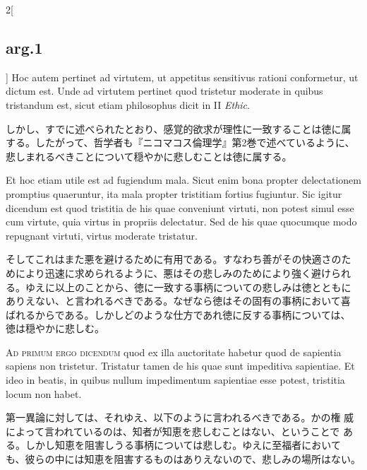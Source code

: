 \documentclass[paper=a4paper,fontsize=10pt,jafontsize=9pt,titlepage]{jlreq}
\begin{document}
\begin{paracol}{2}[\subsection{arg.1}]
Hoc autem pertinet ad virtutem, ut appetitus sensitivus rationi
 conformetur, ut dictum est. Unde ad virtutem pertinet quod tristetur
 moderate in quibus tristandum est, sicut etiam philosophus dicit in
 II {\itshape Ethic}.

\switchcolumn

しかし、すでに述べられたとおり、感覚的欲求が理性に一致することは徳に属
する。したがって、哲学者も『ニコマコス倫理学』第2巻で述べているように、
悲しまれるべきことについて穏やかに悲しむことは徳に属する。

\switchcolumn*

Et hoc etiam utile est ad fugiendum mala. Sicut
 enim bona propter delectationem promptius quaeruntur, ita mala
 propter tristitiam fortius fugiuntur. Sic igitur dicendum est quod
 tristitia de his quae conveniunt virtuti, non potest simul esse cum
 virtute, quia virtus in propriis delectatur. Sed de his quae
 quocumque modo repugnant virtuti, virtus moderate tristatur.

\switchcolumn

そしてこれはまた悪を避けるために有用である。すなわち善がその快適さのた
めにより迅速に求められるように、悪はその悲しみのためにより強く避けられ
る。ゆえに以上のことから、徳に一致する事柄についての悲しみは徳とともに
ありえない、と言われるべきである。なぜなら徳はその固有の事柄において喜
ばれるからである。しかしどのような仕方であれ徳に反する事柄については、
徳は穏やかに悲しむ。

\switchcolumn*[\subsection{ad.1}]

{\scshape Ad primum ergo dicendum} quod ex illa auctoritate habetur
quod de sapientia sapiens non tristetur. Tristatur tamen de his quae
sunt impeditiva sapientiae. Et ideo in beatis, in quibus nullum
impedimentum sapientiae esse potest, tristitia locum non habet.

\switchcolumn

第一異論に対しては、それゆえ、以下のように言われるべきである。かの権
威によって言われているのは、知者が知恵を悲しむことはない、ということで
ある。しかし知恵を阻害しうる事柄については悲しむ。ゆえに至福者において
も、彼らの中には知恵を阻害するものはありえないので、悲しみの場所はない。

\switchcolumn*[\subsection{ad.2}]


\end{paracol}
\end{document}

